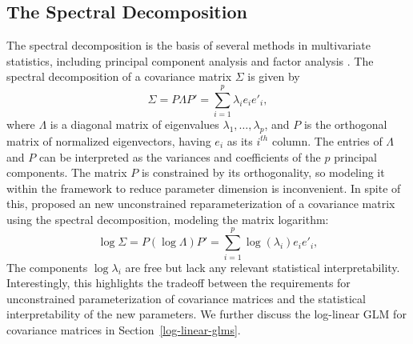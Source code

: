 

\subsection{The Spectral Decomposition}

The spectral decomposition is the basis of several methods in multivariate statistics, including principal component analysis and factor analysis \citep{Anderson84a,hotelling1933analysis}. The spectral decomposition of a covariance matrix $\Sigma$ is given by
\begin{equation} \label{eq:spectral-decomposition}
\Sigma = P \Lambda P' = \sum_{i = 1}^p \lambda_i e_i e'_i,
\end{equation}
\noindent
where $\Lambda$ is a diagonal matrix of eigenvalues $\lambda_1,\dots, \lambda_p$, and $P$ is the orthogonal matrix of normalized eigenvectors, having  $e_i$ as its $i^{th}$ column. The entries of $\Lambda$ and $P$ can be interpreted as the variances and coefficients of the $p$ principal components. The matrix $P$ is constrained by its orthogonality, so modeling it within the framework to reduce parameter dimension is inconvenient. In spite of this, \cite{chiu1996matrix} proposed an new unconstrained reparameterization of a covariance matrix using the spectral decomposition, modeling the matrix logarithm:
\begin{equation} \label{eq:spectral-decomposition}
\log \Sigma = P \left(\log\Lambda\right) P' = \sum_{i = 1}^p \log\left(\lambda_i \right)e_i e'_i,
\end{equation}
\noindent
The components $\log \lambda_i$ are free but lack any relevant statistical interpretability. Interestingly, this highlights the tradeoff between the requirements for unconstrained parameterization of covariance matrices and the statistical interpretability of the new parameters. We further discuss the log-linear GLM for covariance matrices in Section~\ref{log-linear-glms}.


